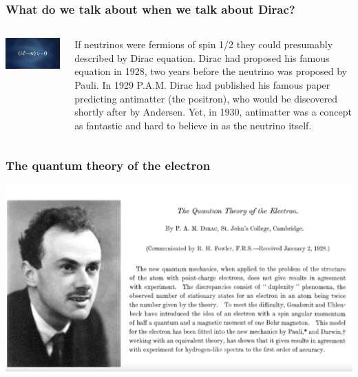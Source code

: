 \begin{frame}
\frametitle{What do we talk about when we talk about Dirac?}
\begin{columns}
\includegraphics[scale=0.20]{img/dirac-eq.png}
 
If neutrinos were fermions of spin 1/2 they could presumably described by Dirac equation. Dirac had proposed his famous equation in 1928, two years before the neutrino was proposed by Pauli.  In 1929 P.A.M. Dirac had published his famous paper predicting antimatter (the positron), who would be discovered shortly after by Andersen. Yet, in 1930, antimatter was a concept as fantastic and hard to believe in as the neutrino itself.  

\end{columns}
\end{frame}

\begin{frame}
\frametitle{The quantum theory of the electron}

\includegraphics[scale=0.3]{img/dirac-eq-paper.png}
 
\end{frame}

